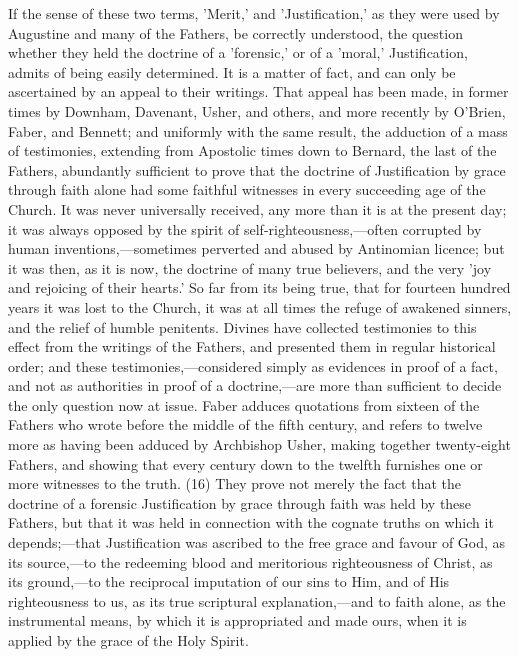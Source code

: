 \documentclass[
]{book}
\begin{document}
If the sense of these two terms, 'Merit,' and 'Justification,' as they were used by Augustine and many of the Fathers, be correctly understood, the question whether they held the doctrine of a 'forensic,' or of a 'moral,' Justification, admits of being easily determined. It is a matter of fact, and can only be ascertained by an appeal to their writings. That appeal has been made, in former times by Downham, Davenant, Usher, and others, and more recently by O'Brien, Faber, and Bennett; and uniformly with the same result, the adduction of a mass of testimonies, extending from Apostolic times down to Bernard, the last of the Fathers, abundantly sufficient to prove that the doctrine of Justification by grace through faith alone had some faithful witnesses in every succeeding age of the Church. It was never universally received, any more than it is at the present day; it was always opposed by the spirit of self-righteousness,---often corrupted by human inventions,---sometimes perverted and abused by Antinomian licence; but it was then, as it is now, the doctrine of many true believers, and the very 'joy and rejoicing of their hearts.' So far from its being true, that for fourteen hundred years it was lost to the Church, it was at all times the refuge of awakened sinners, and the relief of humble penitents. Divines have collected testimonies to this effect from the writings of the Fathers, and presented them in regular historical order; and these testimonies,---considered simply as evidences in proof of a fact, and not as authorities in proof of a doctrine,---are more than sufficient to decide the only question now at issue. Faber adduces quotations from sixteen of the Fathers who wrote before the middle of the fifth century, and refers to twelve more as having been adduced by Archbishop Usher, making together twenty-eight Fathers, and showing that every century down to the twelfth furnishes one or more witnesses to the truth. (16) They prove not merely the fact that the doctrine of a forensic Justification by grace through faith was held by these Fathers, but that it was held in connection with the cognate truths on which it depends;---that Justification was ascribed to the free grace and favour of God, as its source,---to the redeeming blood and meritorious righteousness of Christ, as its ground,---to the reciprocal imputation of our sins to Him, and of His righteousness to us, as its true scriptural explanation,---and to faith alone, as the instrumental means, by which it is appropriated and made ours, when it is applied by the grace of the Holy Spirit.
\end{document}

